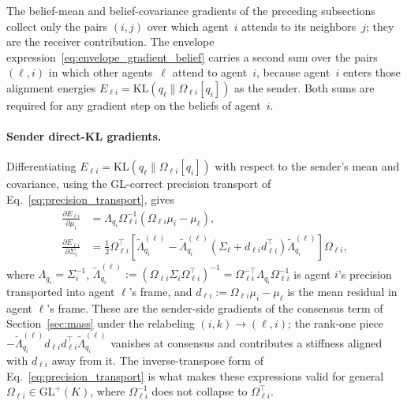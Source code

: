 \documentclass[11pt]{article}
\begin{document}
The belief-mean and belief-covariance gradients of the preceding subsections collect only the pairs $(i,j)$ over which agent~$i$ attends to its neighbors~$j$; they are the receiver contribution. The envelope expression~\eqref{eq:envelope_gradient_belief} carries a second sum over the pairs $(\ell, i)$ in which other agents~$\ell$ attend to agent~$i$, because agent~$i$ enters those alignment energies $E_{\ell i} = \mathrm{KL}(q_\ell \| \Omega_{\ell i}[q_i])$ as the sender. Both sums are required for any gradient step on the beliefs of agent~$i$.

\paragraph{Sender direct-KL gradients.}
Differentiating $E_{\ell i} = \mathrm{KL}(q_\ell \| \Omega_{\ell i}[q_i])$ with respect to the sender's mean and covariance, using the GL-correct precision transport of Eq.~\eqref{eq:precision_transport}, gives
\begin{align}
\frac{\partial E_{\ell i}}{\partial \mu_i} &= \Lambda_{q_i}\Omega_{\ell i}^{-1}\left(\Omega_{\ell i}\mu_i - \mu_\ell\right), \\
\frac{\partial E_{\ell i}}{\partial \Sigma_i} &= \frac{1}{2}\Omega_{\ell i}^{\top}\left[\tilde{\Lambda}_{q_i}^{(\ell)} - \tilde{\Lambda}_{q_i}^{(\ell)}\left(\Sigma_\ell + d_{\ell i}d_{\ell i}^{\top}\right)\tilde{\Lambda}_{q_i}^{(\ell)}\right]\Omega_{\ell i},
\end{align}
where $\Lambda_{q_i} = \Sigma_i^{-1}$, $\tilde{\Lambda}_{q_i}^{(\ell)} := (\Omega_{\ell i}\Sigma_i\Omega_{\ell i}^{\top})^{-1} = \Omega_{\ell i}^{-\top}\Lambda_{q_i}\Omega_{\ell i}^{-1}$ is agent $i$'s precision transported into agent $\ell$'s frame, and $d_{\ell i} := \Omega_{\ell i}\mu_i - \mu_\ell$ is the mean residual in agent $\ell$'s frame. These are the sender-side gradients of the consensus term of Section~\ref{sec:mass} under the relabeling $(i,k) \to (\ell, i)$; the rank-one piece $-\tilde{\Lambda}_{q_i}^{(\ell)}d_{\ell i}d_{\ell i}^{\top}\tilde{\Lambda}_{q_i}^{(\ell)}$ vanishes at consensus and contributes a stiffness aligned with $d_{\ell i}$ away from it. The inverse-transpose form of Eq.~\eqref{eq:precision_transport} is what makes these expressions valid for general $\Omega_{\ell i} \in \mathrm{GL}^{+}(K)$, where $\Omega_{\ell i}^{-1}$ does not collapse to $\Omega_{\ell i}^{\top}$.
\end{document}
